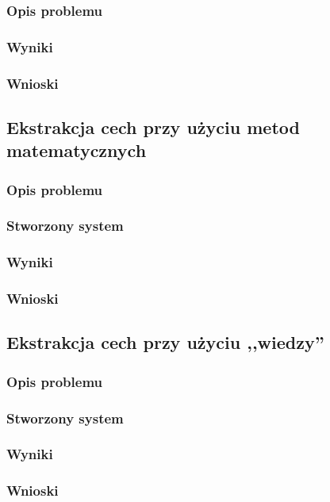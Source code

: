 \subsubsection{Opis problemu}
\subsubsection{Wyniki}
\subsubsection{Wnioski}

\subsection{Ekstrakcja cech przy użyciu metod matematycznych}
\subsubsection{Opis problemu}
\subsubsection{Stworzony system}
\subsubsection{Wyniki}
\subsubsection{Wnioski}

\subsection{Ekstrakcja cech przy użyciu ,,wiedzy''}
\subsubsection{Opis problemu}
\subsubsection{Stworzony system}
\subsubsection{Wyniki}
\subsubsection{Wnioski}

